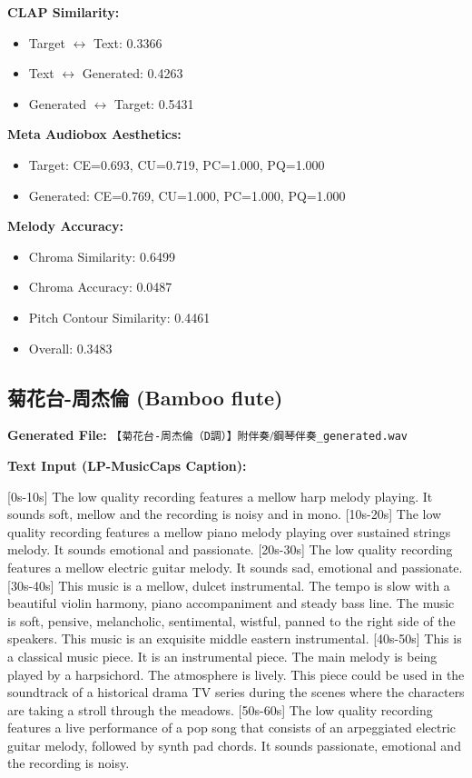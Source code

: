 \documentclass{article}
\begin{document}
\textbf{CLAP Similarity:}
\begin{itemize}
    \item Target $\leftrightarrow$ Text: 0.3366
    \item Text $\leftrightarrow$ Generated: 0.4263
    \item Generated $\leftrightarrow$ Target: 0.5431
\end{itemize}

\textbf{Meta Audiobox Aesthetics:}
\begin{itemize}
    \item Target: CE=0.693, CU=0.719, PC=1.000, PQ=1.000
    \item Generated: CE=0.769, CU=1.000, PC=1.000, PQ=1.000
\end{itemize}

\textbf{Melody Accuracy:}
\begin{itemize}
    \item Chroma Similarity: 0.6499
    \item Chroma Accuracy: 0.0487
    \item Pitch Contour Similarity: 0.4461
    \item Overall: 0.3483
\end{itemize}

\subsection{菊花台-周杰倫 (Bamboo flute)}

\textbf{Generated File:} \texttt{【菊花台-周杰倫（D調）】附伴奏⧸鋼琴伴奏\_generated.wav}

\textbf{Text Input (LP-MusicCaps Caption):}

\small
[0s-10s] The low quality recording features a mellow harp melody playing. It sounds soft, mellow and the recording is noisy and in mono. [10s-20s] The low quality recording features a mellow piano melody playing over sustained strings melody. It sounds emotional and passionate. [20s-30s] The low quality recording features a mellow electric guitar melody. It sounds sad, emotional and passionate. [30s-40s] This music is a mellow, dulcet instrumental. The tempo is slow with a beautiful violin harmony, piano accompaniment and steady bass line. The music is soft, pensive, melancholic, sentimental, wistful, panned to the right side of the speakers. This music is an exquisite middle eastern instrumental. [40s-50s] This is a classical music piece. It is an instrumental piece. The main melody is being played by a harpsichord. The atmosphere is lively. This piece could be used in the soundtrack of a historical drama TV series during the scenes where the characters are taking a stroll through the meadows. [50s-60s] The low quality recording features a live performance of a pop song that consists of an arpeggiated electric guitar melody, followed by synth pad chords. It sounds passionate, emotional and the recording is noisy.
\normalsize
\end{document}
